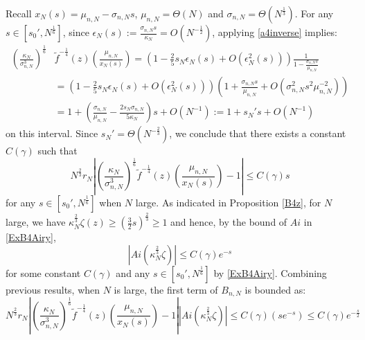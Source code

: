 \documentclass[11pt]{article}
\numberwithin{equation}{section}%
\numberwithin{theorem}{section}
\begin{document}
    Recall $x_N(s)=\mu_{n,N}-\sigma_{n,N}s$, $\mu_{n,N}=\Theta(N)$ and $\sigma_{n,N}=\Theta\left(N^{\frac{1}{3}}\right)$. For any $s\in\left[s_0',N^{\frac{1}{6}}\right]$, since $\epsilon_N(s):=\frac{\sigma_{n,N}s}{\kappa_N}=O\left(N^{-\frac{1}{2}}\right)$, applying \eqref{a4inverse} implies:
\begin{equation}\label{seq1}
        \begin{split}
            \left(\frac{\kappa_N}{\sigma_{n,N}^3}\right)^{\frac{1}{6}}&\tilde{f}^{-\frac{1}{4}}(z)
\left(\frac{\mu_{n,N}}{x_N(s)}\right)=\left(1-\frac{2}{5}s_N\epsilon_N(s)+O\left(\epsilon_N^2(s)\right)\right)\frac{1}{1-\frac{\sigma_{n,N}s}{\mu_{n,N}}}\\
&=\left(1-\frac{2}{5}s_N\epsilon_N(s)+O\left(\epsilon_N^2(s)\right)\right)\left(1+\frac{\sigma_{n,N}s}{\mu_{n,N}}+O\left(\sigma^2_{n,N}s^2\mu_{n,N}^{-2}\right)\right)\\
&=1+\left(\frac{\sigma_{n,N}}{\mu_{n,N}}-\frac{2s_N\sigma_{n,N}}{5\kappa_N}\right)s+O\left(N^{-1}\right):=1+s_N's+O\left(N^{-1}\right)
        \end{split}
    \end{equation}
on this interval. Since $s_N'=\Theta\left(N^{-\frac{2}{3}}\right)$, we conclude that there exists a constant $C(\gamma)$ such that
\begin{equation*}
   N^{\frac{2}{3}} r_N\left|\left(\frac{\kappa_N}{\sigma_{n,N}^3}\right)^{\frac{1}{6}}\tilde{f}^{-\frac{1}{4}}(z)
\left(\frac{\mu_{n,N}}{x_N(s)}\right)-1\right|\le C(\gamma)s
\end{equation*}
for any $s\in\left[s_0',N^{\frac{1}{6}}\right]$ when $N$ large. As indicated in Proposition \ref{B4z}, for $N$ large, we have $\kappa_N^{\frac{2}{3}}\zeta(z)\ge \left(\frac{3}{2}s\right)^{\frac{2}{3}}\ge1$ and hence, by the bound of $Ai$ in \eqref{ExB4Airy},
     \begin{equation}\label{Aizeta}
         \left|Ai\left(\kappa_N^{\frac{2}{3}}\zeta\right)\right|\le C(\gamma)e^{-s}
     \end{equation}
     for some constant $C(\gamma)$ and any $s\in\left[s_0',N^{\frac{1}{6}}\right]$ by \eqref{ExB4Airy}. Combining previous results, when $N$ is large, the first term of $B_{n,N}$ is bounded as:
     \begin{equation}\label{1st4B}
         N^{\frac{2}{3}} r_N\left|\left(\frac{\kappa_N}{\sigma_{n,N}^3}\right)^{\frac{1}{6}}\tilde{f}^{-\frac{1}{4}}(z)
\left(\frac{\mu_{n,N}}{x_N(s)}\right)-1\right|\left|Ai\left(\kappa_N^{\frac{2}{3}}\zeta\right)\right|\le C(\gamma)(se^{-s})\le C(\gamma)e^{-\frac{s}{2}}
     \end{equation}
\end{document}

